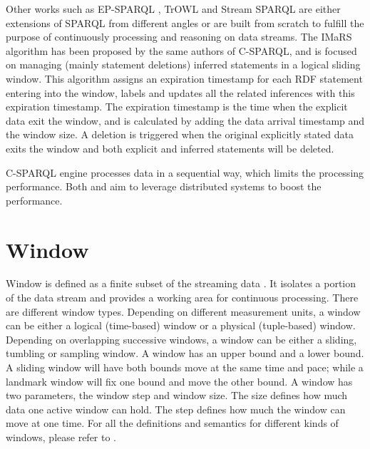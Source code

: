Other works such as EP-SPARQL \cite{anicic2011ep}, TrOWL \cite{thomas2010trowl} and Stream SPARQL \cite{bolles2008streaming} are either extensions of SPARQL from different angles or are built from scratch to fulfill the purpose of continuously processing and reasoning on data streams.
The IMaRS \cite{barbieri2010incremental} algorithm has been proposed by the same authors of C-SPARQL, and is focused on managing (mainly statement deletions) inferred statements in a logical sliding window.
This algorithm assigns an expiration timestamp for each RDF statement entering into the window, labels and updates all the related inferences with this expiration timestamp.
The expiration timestamp is the time when the explicit data exit the window, and is calculated by adding the data arrival timestamp and the window size.
A deletion is triggered when the original explicitly stated data exits the window and both explicit and inferred statements will be deleted.

C-SPARQL engine processes data in a sequential way, which limits the processing performance. 
Both \cite{DBLP:journals/corr/RenC17} and \cite{DBLP:conf/semweb/RenCKKC16} aim to leverage distributed systems to boost the performance. 
%
\section{Window}
Window is defined as a finite subset of the streaming data \cite{patroumpas2006window}.
It isolates a portion of the data stream and provides a working area for continuous processing. 
There are different window types. 
Depending on different measurement units, a window can be either a logical (time-based) window or a physical (tuple-based) window.
Depending on overlapping successive windows, a window can be either a sliding, tumbling or sampling window. 
A window has an upper bound and a lower bound. 
A sliding window will have both bounds move at the same time and pace; while a landmark window will fix one bound and move the other bound.
A window has two parameters, the window step and window size. 
The size defines how much data one active window can hold. 
The step defines how much the window can move at one time.
For all the definitions and semantics for different kinds of windows, please refer to \cite{patroumpas2006window}. 

